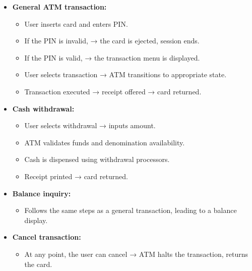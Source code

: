 \begin{itemize}
\item
\protect{}\label{ju9hHj_XYcjqBd3c1BA7i}
\textbf{General ATM transaction:}

\begin{itemize}
\item
User inserts card and enters PIN.
\item
If the PIN is invalid, → the card is ejected, session ends.
\item
If the PIN is valid, → the transaction menu is displayed.
\item
User selects transaction → ATM transitions to appropriate state.
\item
Transaction executed → receipt offered → card returned.
\end{itemize}
\item
\protect{}\label{Be7dtD3x7fX1EsXb_rhv1}
\textbf{Cash withdrawal:}

\begin{itemize}
\item
User selects withdrawal → inputs amount.
\item
ATM validates funds and denomination availability.
\item
Cash is dispensed using withdrawal processors.
\item
Receipt printed → card returned.
\end{itemize}
\item
\protect{}\label{j6BpJAPDlQYzN-MdDcwHF}
\textbf{Balance inquiry:}

\begin{itemize}
\item
Follows the same steps as a general transaction, leading to a balance display.
\end{itemize}
\item
\protect{}\label{b-umn83H0AmF5X-nhLoWV}
\textbf{Cancel transaction:}

\begin{itemize}
\item
At any point, the user can cancel → ATM halts the transaction, returns the card.
\end{itemize}
\end{itemize}

